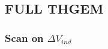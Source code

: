 \documentclass[a4paper, 11 pt]{article}
\newcommand{\Vind}{$\Delta V_{ind}$}
\begin{document}




\subsection{FULL THGEM}

\subsubsection{Scan on \Vind}

\end{document}
